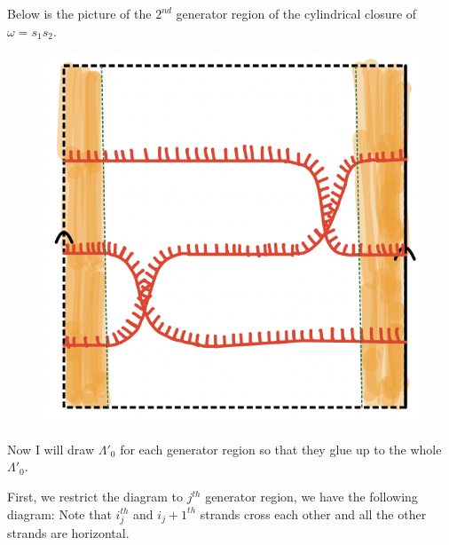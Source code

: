 Below is the picture of the $2^{nd}$ generator region of the cylindrical closure of $\omega = s_1 s_2$.

\begin{figure}[H]
    \centering
    \includegraphics[scale = 0.55]{diagrams/natural_alternating_diagrams/7-2.png}
    \caption{}
    \label{fig:your-label}
\end{figure}

Now I will draw $\Lambda'_0$ for each generator region so that they glue up to the whole $\Lambda'_0$. 

First, we restrict the diagram to $j^{th}$ generator region, we have the following diagram: Note that $i_j^{th}$ and $i_{j}+1^{th}$ strands cross each other and all the other strands are horizontal.

